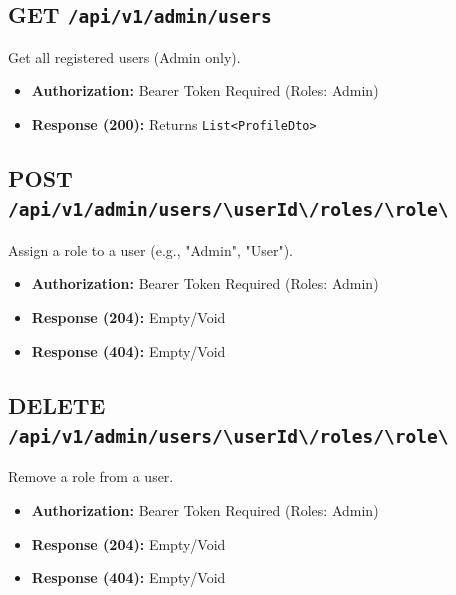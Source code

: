 \subsection{GET \texttt{/api/v1/admin/users}}
Get all registered users (Admin only).
\begin{itemize}
    \item \textbf{Authorization:} Bearer Token Required (Roles: Admin)
    \item \textbf{Response (200):} Returns \texttt{List<ProfileDto>}
\end{itemize}

\subsection{POST \texttt{/api/v1/admin/users/\textbackslash{}{userId\textbackslash{}}/roles/\textbackslash{}{role\textbackslash{}}}}
Assign a role to a user (e.g., "Admin", "User").
\begin{itemize}
    \item \textbf{Authorization:} Bearer Token Required (Roles: Admin)
    \item \textbf{Response (204):} Empty/Void
    \item \textbf{Response (404):} Empty/Void
\end{itemize}

\subsection{DELETE \texttt{/api/v1/admin/users/\textbackslash{}{userId\textbackslash{}}/roles/\textbackslash{}{role\textbackslash{}}}}
Remove a role from a user.
\begin{itemize}
    \item \textbf{Authorization:} Bearer Token Required (Roles: Admin)
    \item \textbf{Response (204):} Empty/Void
    \item \textbf{Response (404):} Empty/Void
\end{itemize}

